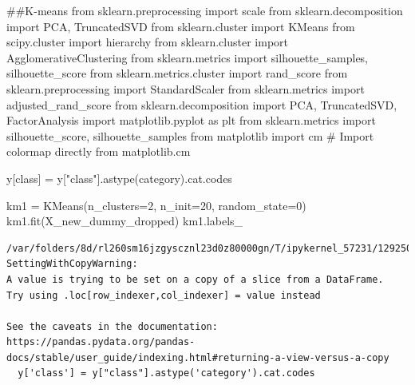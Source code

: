 \documentclass[
  11pt,
  letterpaper,
  DIV=11,
  numbers=noendperiod]{scrartcl}
\newenvironment{Shaded}{\begin{snugshade}}{\end{snugshade}}
\newcommand{\CommentTok}[1]{\textcolor[rgb]{0.37,0.37,0.37}{#1}}
\newcommand{\DecValTok}[1]{\textcolor[rgb]{0.68,0.00,0.00}{#1}}
\newcommand{\ImportTok}[1]{\textcolor[rgb]{0.00,0.46,0.62}{#1}}
\newcommand{\NormalTok}[1]{\textcolor[rgb]{0.00,0.23,0.31}{#1}}
\newcommand{\OperatorTok}[1]{\textcolor[rgb]{0.37,0.37,0.37}{#1}}
\newcommand{\StringTok}[1]{\textcolor[rgb]{0.13,0.47,0.30}{#1}}
\begin{document}
\begin{Shaded}
\begin{Highlighting}[]
\CommentTok{\#\#K{-}means}
\ImportTok{from}\NormalTok{ sklearn.preprocessing }\ImportTok{import}\NormalTok{ scale}
\ImportTok{from}\NormalTok{ sklearn.decomposition }\ImportTok{import}\NormalTok{ PCA, TruncatedSVD}
\ImportTok{from}\NormalTok{ sklearn.cluster }\ImportTok{import}\NormalTok{ KMeans}
\ImportTok{from}\NormalTok{ scipy.cluster }\ImportTok{import}\NormalTok{ hierarchy}
\ImportTok{from}\NormalTok{ sklearn.cluster }\ImportTok{import}\NormalTok{ AgglomerativeClustering}
\ImportTok{from}\NormalTok{ sklearn.metrics }\ImportTok{import}\NormalTok{ silhouette\_samples, silhouette\_score}
\ImportTok{from}\NormalTok{ sklearn.metrics.cluster }\ImportTok{import}\NormalTok{ rand\_score}
\ImportTok{from}\NormalTok{ sklearn.preprocessing }\ImportTok{import}\NormalTok{ StandardScaler}
\ImportTok{from}\NormalTok{ sklearn.metrics }\ImportTok{import}\NormalTok{ adjusted\_rand\_score}
\ImportTok{from}\NormalTok{ sklearn.decomposition }\ImportTok{import}\NormalTok{ PCA, TruncatedSVD, FactorAnalysis}
\ImportTok{import}\NormalTok{ matplotlib.pyplot }\ImportTok{as}\NormalTok{ plt}
\ImportTok{from}\NormalTok{ sklearn.metrics }\ImportTok{import}\NormalTok{ silhouette\_score, silhouette\_samples}
\ImportTok{from}\NormalTok{ matplotlib }\ImportTok{import}\NormalTok{ cm  }\CommentTok{\# Import colormap directly from matplotlib.cm}
\end{Highlighting}
\end{Shaded}

\begin{Shaded}
\begin{Highlighting}[]
\NormalTok{y[}\StringTok{\textquotesingle{}class\textquotesingle{}}\NormalTok{] }\OperatorTok{=}\NormalTok{ y[}\StringTok{"class"}\NormalTok{].astype(}\StringTok{\textquotesingle{}category\textquotesingle{}}\NormalTok{).cat.codes}

\NormalTok{km1 }\OperatorTok{=}\NormalTok{ KMeans(n\_clusters}\OperatorTok{=}\DecValTok{2}\NormalTok{, n\_init}\OperatorTok{=}\DecValTok{20}\NormalTok{, random\_state}\OperatorTok{=}\DecValTok{0}\NormalTok{)}
\NormalTok{km1.fit(X\_new\_dummy\_dropped)}
\NormalTok{km1.labels\_}
\end{Highlighting}
\end{Shaded}

\begin{verbatim}
/var/folders/8d/rl260sm16jzgyscznl23d0z80000gn/T/ipykernel_57231/1292506993.py:1: SettingWithCopyWarning: 
A value is trying to be set on a copy of a slice from a DataFrame.
Try using .loc[row_indexer,col_indexer] = value instead

See the caveats in the documentation: https://pandas.pydata.org/pandas-docs/stable/user_guide/indexing.html#returning-a-view-versus-a-copy
  y['class'] = y["class"].astype('category').cat.codes
\end{verbatim}
\end{document}
